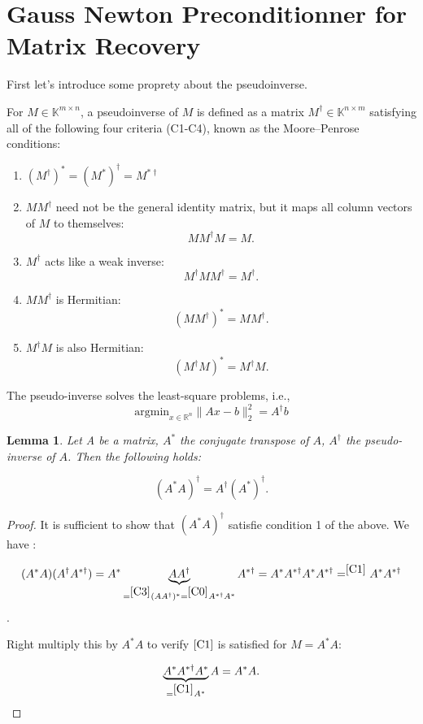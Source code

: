 \documentclass{article}
\newtheorem{lemma}{Lemma}
\newcommand{\pinv}[1]{#1^{\dagger}}
\begin{document}
\section{Gauss Newton Preconditionner for Matrix Recovery}
First let's introduce some proprety about the pseudoinverse.

For $M \in \mathbb{K}^{m \times n}$, a pseudoinverse of $M$ is defined as a matrix $M^\dagger \in \mathbb{K}^{n \times m}$ satisfying all of the following four criteria (C1-C4), known as the Moore–Penrose conditions:

\begin{enumerate}[label=c\arabic*),ref=c\arabic*, start=0]
    \item \label{C0} $(\pinv{M})^* = \pinv{(M^*)} = M^{* \dagger}$
    \item \label{C1} \(M\pinv{M}\) need not be the general identity matrix, but it maps all column vectors of \(M\) to themselves:
    \[M\pinv{M}M = M.\]
    
    \item \label{C2} \(\pinv{M}\) acts like a weak inverse:
    \[\pinv{M}M\pinv{M} = \pinv{M}.\]
    
    \item \label{C3} \(M\pinv{M}\) is Hermitian:
    \[(M\pinv{M})^{*} = M\pinv{M}.\]
    
    \item \label{C4} \(\pinv{M}M\) is also Hermitian:
    \[(\pinv{M}M)^{*} = \pinv{M}M.\]
\end{enumerate}
The pseudo-inverse solves the least-square problems, i.e., 
$$
\text{argmin}_{x \in \mathbb{R}^n} \| Ax - b \|_2^2 =A^\dagger b
$$

\begin{lemma}
\label{l1}
Let A be a matrix, $A^*$ the conjugate transpose of $A$, $A^\dagger$ the pseudo-inverse of $A$. Then the following holds:

$$
(A^* A)^\dagger = A^\dagger (A^*)^\dagger.
$$
\end{lemma}

\begin{proof}
It is sufficient to show that $(A^* A)^\dagger$ satisfie condition 1 of the above. We have :

$$
(A^* A) (A^\dagger A^{* \dagger} ) = A^* \underbrace{A A^{\dagger}}_{=^{\ref{C3}}(AA^{\dagger})^* =^{\ref{C0}} A^{* \dagger} A^* } A^{* \dagger}  = A^* A^{* \dagger} A^* A^{* \dagger}  = ^{\ref{C1}} A^* {A^{* \dagger}}
$$.


Right multiply this by $A^* A$ to verify $\ref{C1}$ is satisfied for $M=A^* A$:

$$
 \underbrace{A^* A^{* \dagger} A^*}_{=^{\ref{C1}} A^*} A = A^* A. 
$$
\end{proof}
\end{document}

